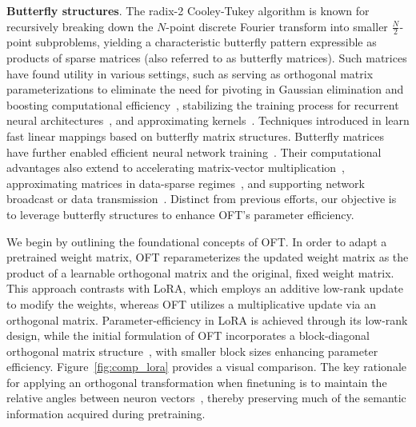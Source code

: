 \textbf{Butterfly structures}. The radix-2 Cooley-Tukey algorithm is known for recursively breaking down the $N$-point discrete Fourier transform into smaller $\frac{N}{2}$-point subproblems, yielding a characteristic butterfly pattern expressible as products of sparse matrices (also referred to as butterfly matrices). Such matrices have found utility in various settings, such as serving as orthogonal matrix parameterizations to eliminate the need for pivoting in Gaussian elimination and boosting computational efficiency~\cite{parker1995random}, stabilizing the training process for recurrent neural architectures~\cite{jing2017tunable}, and approximating kernels~\cite{munkhoeva2018quadrature}. Techniques introduced in \cite{dao2019learning,dao2019kaleidoscope} learn fast linear mappings based on butterfly matrix structures. Butterfly matrices have further enabled efficient neural network training~\cite{chen2022pixelated,dao2022monarch}. Their computational advantages also extend to accelerating matrix-vector multiplication~\cite{michielssen1996multilevel,o2010algorithm}, approximating matrices in data-sparse regimes~\cite{li2015butterfly}, and supporting network broadcast or data transmission~\cite{klasing1994broadcasting,li2003linear,rajasingh2016transmission}. Distinct from previous efforts, our objective is to leverage butterfly structures to enhance OFT’s parameter efficiency.

We begin by outlining the foundational concepts of OFT. In order to adapt a pretrained weight matrix, OFT reparameterizes the updated weight matrix as the product of a learnable orthogonal matrix and the original, fixed weight matrix. This approach contrasts with LoRA, which employs an additive low-rank update to modify the weights, whereas OFT utilizes a multiplicative update via an orthogonal matrix. Parameter-efficiency in LoRA is achieved through its low-rank design, while the initial formulation of OFT incorporates a block-diagonal orthogonal matrix structure~\cite{qiu2023controlling}, with smaller block sizes enhancing parameter efficiency. Figure~\ref{fig:comp_lora} provides a visual comparison. The key rationale for applying an orthogonal transformation when finetuning is to maintain the relative angles between neuron vectors~\cite{liu2018learning,liu2021orthogonal,qiu2023controlling}, thereby preserving much of the semantic information acquired during pretraining.

